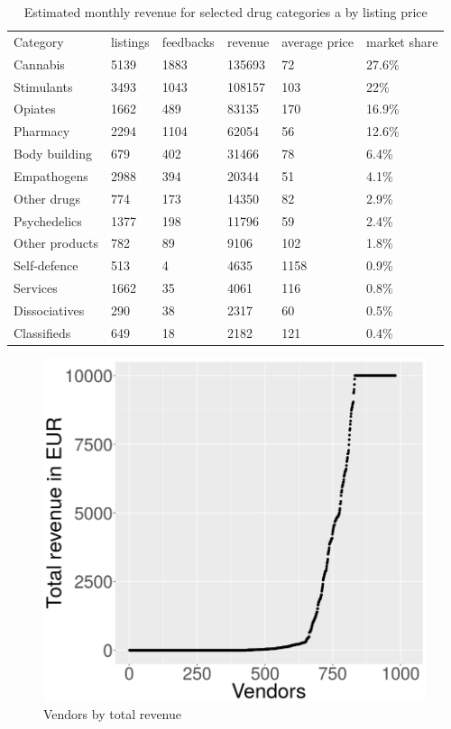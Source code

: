 \documentclass[
  digital, %
  table,   %
  lof,     %
  lot,     %
  oneside
]{fithesis3}
\begin{document}
\begin{table}
    \caption{Estimated monthly revenue for selected drug categories a by listing price}
\hspace*{-2cm}
    \label{categories}
    \begin{tabular}{|l|l|l|l|l|l|}
Category & listings & feedbacks & revenue & average price & market share \\
Cannabis & 5139 & 1883 & 135693 & 72 & 27.6\% \\
Stimulants & 3493 & 1043 & 108157 & 103 & 22\% \\
Opiates & 1662 & 489 & 83135 & 170 & 16.9\% \\
Pharmacy & 2294 & 1104 & 62054 & 56 & 12.6\% \\
Body building & 679 & 402 & 31466 & 78 & 6.4\% \\
Empathogens & 2988 & 394 & 20344 & 51 &4.1\% \\
Other drugs &  774 & 173 & 14350 & 82 & 2.9\% \\
Psychedelics & 1377 & 198 & 11796&59  & 2.4\% \\
Other products &  782 & 89 & 9106& 102 & 1.8\% \\
Self-defence &  513 & 4 & 4635 &  1158  & 0.9\% \\
Services & 1662 & 35 & 4061 &  116  &0.8\% \\
Dissociatives &  290 & 38 & 2317& 60  & 0.5\% \\
Classifieds &  649 & 18 & 2182 &  121  & 0.4\% \\
    \end{tabular}
\end{table}

 \begin{figure}[!htb]
    \centering
    \includegraphics[scale=0.4]{total-rev}
    \caption{Vendors by total revenue}
    \label{total-rev}
\end{figure}
\end{document}
